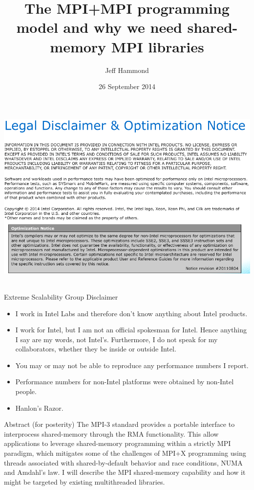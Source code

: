 \documentclass[11pt]{beamer}
\title[MPI+MPI]{The MPI+MPI programming model and why we need shared-memory MPI libraries}
\author[Jeff Hammond]{Jeff Hammond}
\institute[Intel Labs]{Extreme Scalability Group \& Parallel Computing Lab\\ Intel Corporation (Portland, OR)}
\date[]{26 September 2014}
\begin{document}
\frame{\titlepage}

\begin{frame}{}
\includegraphics[scale=0.33,angle=0]{intel-legal} \
\end{frame}

\begin{frame}{Extreme Scalability Group Disclaimer}
    \begin{itemize}
        \item I work in Intel Labs and therefore don't know anything about Intel products.
        \item I work for Intel, but I am not an official spokesman for Intel.
              Hence anything I say are my words, not Intel's.
              Furthermore, I do not speak for my collaborators,
              whether they be inside or outside Intel.
        \item You may or may not be able to reproduce any performance numbers I report.
        \item Performance numbers for non-Intel platforms were obtained by non-Intel people.
        \item Hanlon's Razor.
    \end{itemize}
\end{frame}

\begin{frame}{Abstract (for posterity)}
    The MPI-3 standard provides a portable interface to interprocess 
    shared-memory through the RMA functionality. This allow applications 
    to leverage shared-memory programming within a strictly MPI paradigm, 
    which mitigates some of the challenges of MPI+X programming using 
    threads associated with shared-by-default behavior and race conditions, 
    NUMA and Amdahl's law. I will describe the MPI shared-memory capability 
    and how it might be targeted by existing multithreaded libraries.
\end{frame}
\end{document}
